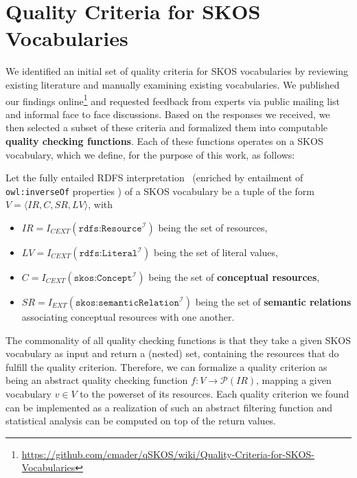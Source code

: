 
\section{Quality Criteria for SKOS Vocabularies}\label{sec:criteria}


We identified an initial set of quality criteria for SKOS vocabularies by reviewing existing literature and manually examining existing vocabularies. We published our findings online\footnote{\url{https://github.com/cmader/qSKOS/wiki/Quality-Criteria-for-SKOS-Vocabularies}} and requested feedback from experts via public mailing list and informal face to face discussions. Based on the responses we received, we then selected a subset of these criteria and formalized them into computable \textbf{quality checking functions}. Each of these functions operates on a SKOS vocabulary, which we define, for the purpose of this work, as follows:

\begin{definition} Let the fully entailed RDFS interpretation~\cite{RDFSEM2012} (enriched by entailment of \texttt{owl:inverseOf} properties ) of a SKOS vocabulary be a tuple of the form $V = \langle IR, C, SR, LV \rangle$, with
    
\begin{itemize}
	\item \(IR = I_{CEXT}(\texttt{rdfs:Resource}^\mathcal{I})\) being the set of resources,

	\item $LV = I_{CEXT}(\texttt{rdfs:Literal}^\mathcal{I})$ being the set of literal values,

	\item \(C = I_{CEXT}(\texttt{skos:Concept}^\mathcal{I})\) being the set of \textbf{conceptual resources},

	\item \(SR = I_{EXT}(\texttt{skos:semanticRelation}^\mathcal{I})\) being the set of \textbf{semantic relations} associating conceptual resources with one another.

\end{itemize}

\end{definition}

The commonality of all quality checking functions is that they take a given SKOS vocabulary as input and return a (nested) set, containing the resources that do  fulfill the quality criterion. Therefore, we can formalize a quality criterion as being an abstract quality checking function $f:V \rightarrow \mathcal{P}(IR)$, mapping a given vocabulary $v \in V$ to the powerset of its resources. Each quality criterion we found can be implemented as a realization of such an abstract filtering function and statistical analysis can be computed on top of the return values.

